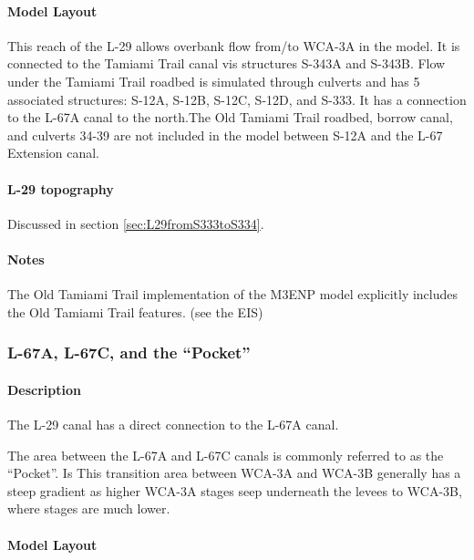 \paragraph{Model Layout}
This reach of the L-29 allows overbank flow from/to WCA-3A in the model. It is connected to the Tamiami Trail canal vis structures S-343A and S-343B. Flow under the Tamiami Trail roadbed is simulated through culverts  and has 5 associated structures: S-12A, S-12B, S-12C, S-12D, and S-333. It has a connection to the L-67A canal to the north.The Old Tamiami Trail roadbed, borrow canal, and culverts 34-39 are not included in the model between S-12A and the L-67 Extension canal.

\paragraph{L-29 topography}
Discussed in section \ref{sec:L29fromS333toS334}.

\begin{notes}
\paragraph{Notes}

The Old Tamiami Trail implementation of the M3ENP model explicitly includes the Old Tamiami Trail features. (see the EIS)
\end{notes}

\clearpage

\subsubsection{L-67A, L-67C, and the ``Pocket''}

\paragraph{Description}
The L-29 canal has a direct connection to the L-67A canal.

The area between the L-67A and L-67C canals is commonly referred to as the ``Pocket''. Is This transition area between WCA-3A and WCA-3B generally has a steep gradient as higher WCA-3A stages seep underneath the levees to WCA-3B, where stages are much lower.

\paragraph{Model Layout}

